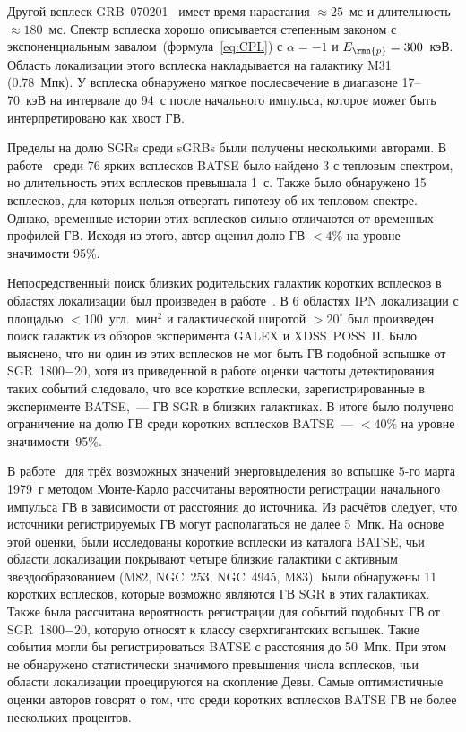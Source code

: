 Другой всплеск GRB~070201~\citep{Mazets2008,Ofek2008} имеет время нарастания $\approx 25$~мс 
и длительность $\approx 180$~мс. Спектр всплеска хорошо описывается степенным законом 
с экспоненциальным завалом~(формула~\ref{eq:CPL}) с $\alpha=-1$ и $E_{\rmn{p}}=300$~кэВ. Область локализации 
этого всплеска накладывается на галактику M31 (0.78~Мпк). У всплеска обнаружено 
мягкое послесвечение в диапазоне 17--70~кэВ на интервале до 94~с после начального 
импульса, которое может быть интерпретировано как хвост ГВ.

Пределы на долю SGRs среди sGRBs были получены несколькими авторами. 
В работе~\citep{Lazzati2005} среди 76 ярких всплесков BATSE было найдено 3 с тепловым 
спектром, но длительность этих всплесков превышала 1~с. Также было обнаружено 
15 всплесков, для которых нельзя отвергать гипотезу об их тепловом спектре. 
Однако, временные истории этих всплесков сильно отличаются от временных профилей ГВ. 
Исходя из этого, автор оценил долю ГВ $<4$\% на уровне значимости 95\%.

Непосредственный поиск  близких родительских галактик коротких всплесков в 
областях локализации был произведен в работе~\citep{Nakar2006}. В 6 областях IPN 
локализации с площадью $<100$~угл.~мин$^2$ и галактической широтой $>20^{\circ}$ 
был произведен поиск галактик из обзоров эксперимента GALEX и XDSS~POSS~II. 
Было выяснено, что ни один из этих всплесков не мог быть ГВ подобной вспышке 
от SGR~1800$-$20, хотя из приведенной в работе оценки частоты детектирования таких 
событий следовало, что все короткие всплески, зарегистрированные в эксперименте 
BATSE,~--- ГВ SGR в близких галактиках. В итоге было получено ограничение на долю 
ГВ среди коротких всплесков BATSE~--- $<40$\% на уровне значимости~95\%.

В работе~\citep{Popov2006} для трёх возможных значений энерговыделения во вспышке 
5-го марта 1979~г  методом Монте-Карло рассчитаны вероятности регистрации начального 
импульса ГВ в зависимости от расстояния до источника. Из расчётов следует, 
что источники регистрируемых ГВ могут располагаться не далее 5~Мпк. На основе этой оценки, 
были исследованы короткие всплески из каталога BATSE, чьи области локализации 
покрывают четыре близкие галактики с активным звездообразованием (M82, NGC~253, NGC~4945, M83). 
Были обнаружены 11 коротких всплесков, которые возможно являются ГВ SGR в этих галактиках. 
Также была рассчитана вероятность регистрации для событий подобных ГВ от SGR~1800$-$20, 
которую относят к классу сверхгигантских вспышек. Такие события могли бы 
регистрироваться BATSE с расстояния до 50~Мпк. При этом не обнаружено статистически 
значимого превышения числа всплесков, чьи области локализации проецируются на скопление Девы. 
Самые оптимистичные оценки авторов говорят о том, что среди коротких всплесков 
BATSE ГВ не более нескольких процентов.

